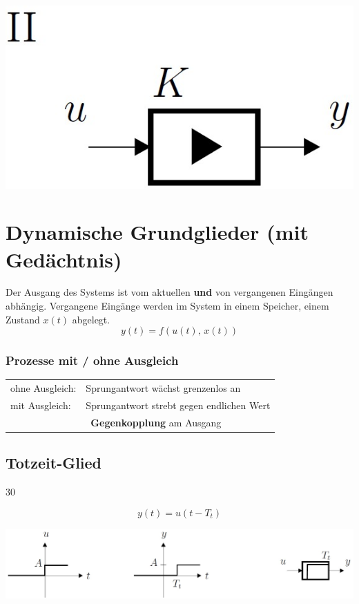 \hfill
\begin{minipage}{0.23\columnwidth}
    \includegraphics[width=0.8\columnwidth]{images/symbol_p-glied_2}
\end{minipage}


\section{Dynamische Grundglieder (mit Gedächtnis)}

Der Ausgang des Systems ist vom aktuellen \textbf{und} von vergangenen Eingängen abhängig.
Vergangene Eingänge werden im System in einem Speicher, einem Zustand $x(t)$ abgelegt. 
$$ y(t) = f( u(t), \, x(t) ) $$


\subsubsection{Prozesse mit / ohne Ausgleich}

\begin{tabular}{ll}
ohne Ausgleich:     & Sprungantwort wächst grenzenlos an \\
mit Ausgleich:      & Sprungantwort strebt gegen endlichen Wert \\
				    & \textrightarrow\ \textbf{Gegenkopplung} am Ausgang
\end{tabular}


\subsection{Totzeit-Glied}{30}

$$ \boxed{ y(t) =  u(t - T_t) }  $$

\includegraphics[width=0.9\columnwidth]{images/totzeit-glied}



